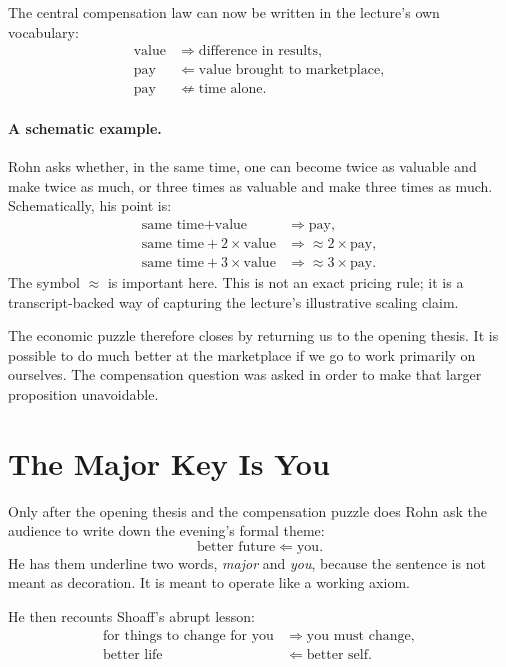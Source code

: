 The central compensation law can now be written in the lecture's own vocabulary:
\begin{align}
\text{value} &\Rightarrow \text{difference in results},\\
\text{pay} &\Leftarrow \text{value brought to marketplace},\\
\text{pay} &\not\Leftarrow \text{time alone}.
\end{align}

\paragraph{A schematic example.} Rohn asks whether, in the same time, one can become twice as valuable and make twice as much, or three times as valuable and make three times as much. Schematically, his point is:
\begin{align}
\text{same time} + \text{value} &\Rightarrow \text{pay},\\
\text{same time} + 2\times \text{value} &\Rightarrow \approx 2\times \text{pay},\\
\text{same time} + 3\times \text{value} &\Rightarrow \approx 3\times \text{pay}.
\end{align}
The symbol \(\approx\) is important here. This is not an exact pricing rule; it is a transcript-backed way of capturing the lecture's illustrative scaling claim.

The economic puzzle therefore closes by returning us to the opening thesis. It is possible to do much better at the marketplace if we go to work primarily on ourselves. The compensation question was asked in order to make that larger proposition unavoidable.

\section{The Major Key Is You}

Only after the opening thesis and the compensation puzzle does Rohn ask the audience to write down the evening's formal theme:
\begin{equation}
\text{better future} \Leftarrow \text{you}.
\end{equation}
He has them underline two words, \emph{major} and \emph{you}, because the sentence is not meant as decoration. It is meant to operate like a working axiom.

He then recounts Shoaff's abrupt lesson:
\begin{align}
\text{for things to change for you} &\Rightarrow \text{you must change},\\
\text{better life} &\Leftarrow \text{better self}.
\end{align}

